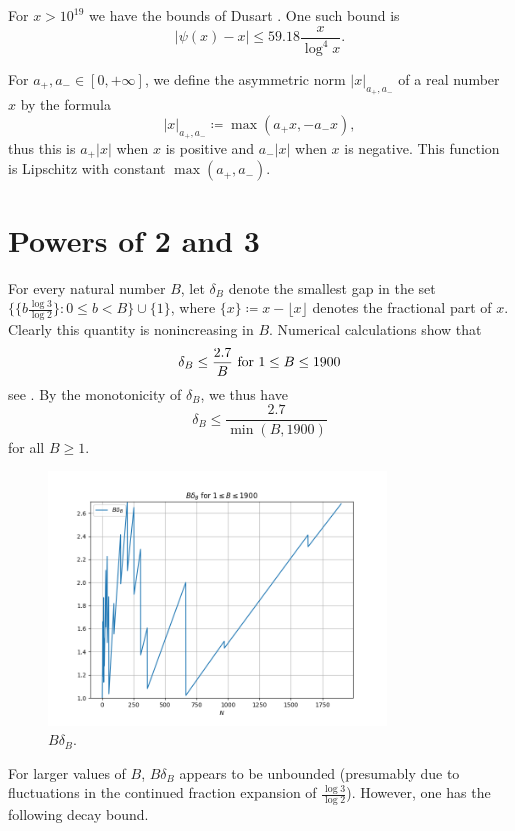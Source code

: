 \documentclass[12pt,a4paper,reqno]{amsart}
\numberwithin{equation}{section}
\theoremstyle{plain}
\theoremstyle{definition}
\begin{document}
  For $x > 10^{19}$ we have the bounds of Dusart \cite{dusart}.  One such bound is
  $$ |\psi(x) - x| \leq 59.18 \frac{x}{\log^4 x}.$$
  
  For $a_+,a_- \in [0,+\infty]$, we define the asymmetric norm $|x|_{a_+,a_-}$ of a real number $x$ by the formula
  $$ |x|_{a_+,a_-} \coloneqq \max(a_+ x, -a_- x),$$
thus this is $a_+ |x|$ when $x$ is positive and $a_- |x|$ when $x$ is negative.  This function is Lipschitz with constant $\max(a_+,a_-)$.

\section{Powers of 2 and 3}

For every natural number $B$, let $\delta_B$ denote the smallest gap in the set $\{ \{b \frac{\log 3}{\log 2}\}: 0 \leq b < B \} \cup \{1\}$, where $\{x\} \coloneqq x - \lfloor x\rfloor$ denotes the fractional part of $x$.  Clearly this quantity is nonincreasing in $B$. Numerical calculations show that
$$
 \delta_B \leq \frac{2.7}{B} \hbox{ for } 1 \leq B \leq 1900
$$
see . By the monotonicity of $\delta_B$, we thus have
\begin{equation}\label{delta-b}
 \delta_B \leq \frac{2.7}{\min(B, 1900)}
\end{equation}
for all $B \geq 1$.

\begin{figure}
  \centering
  \includegraphics[width=0.8\textwidth]{log3_log2_plot.png}
  \caption{$B \delta_B$.}\label{fig-log}
\end{figure}

For larger values of $B$, $B \delta_B$ appears to be unbounded (presumably due to fluctuations in the continued fraction expansion of $\frac{\log 3}{\log 2}$).  However, one has the following decay bound.
\end{document}

